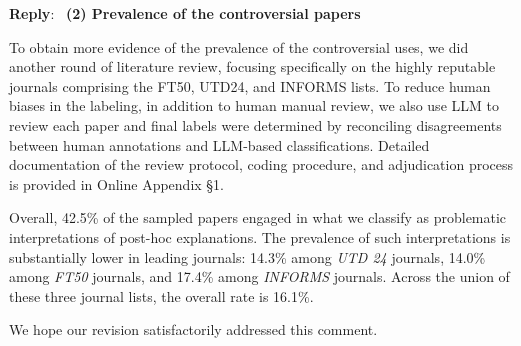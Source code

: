 \documentclass[11pt]{article}
\newcounter{se}[section]
\newenvironment{reply}
 {\par\medskip \noindent \begin{sf}\textbf{Reply}:\ }
 {\medskip \end{sf}}
\begin{document}
\begin{reply}
\vspace{0.3cm}\textbf{(2) Prevalence of the controversial papers}

To obtain more evidence of the prevalence of the controversial uses, we did another round of literature review, focusing specifically on the highly reputable journals comprising the FT50, UTD24, and INFORMS lists.  To reduce human biases in the labeling, in addition to human manual review, we also use LLM to review each paper and final labels were determined by reconciling disagreements between human annotations and LLM-based classifications. Detailed documentation of the review protocol, coding procedure, and adjudication process is provided in Online Appendix \S 1.  

Overall, 42.5\% of the sampled papers engaged in what we classify as problematic interpretations of post-hoc explanations. The prevalence of such interpretations is substantially lower in leading journals: 14.3\% among \textit{UTD 24} journals, 14.0\% among \textit{FT50} journals, and 17.4\% among \textit{INFORMS} journals. Across the union of these three journal lists, the overall rate is 16.1\%.

We hope our revision satisfactorily addressed this comment.








\end{reply}
\end{document}

